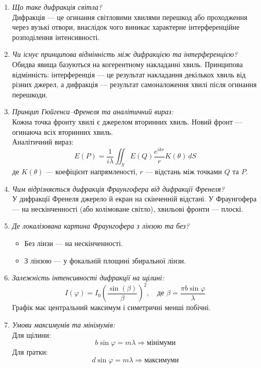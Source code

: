 \documentclass[12pt,a4paper]{article}
\begin{document}
\begin{enumerate}
  \item \textit{Що таке дифракція світла?} \\
  Дифракція --- це огинання світловими хвилями перешкод або проходження через вузькі отвори, внаслідок чого виникає характерне інтерференційне розподілення інтенсивності.

  \item \textit{Чи існує принципова відмінність між дифракцією та інтерференцією?} \\
  Обидва явища базуються на когерентному накладанні хвиль. Принципова відмінність: інтерференція — це результат накладання декількох хвиль від різних джерел, а дифракція — результат самоналоження хвилі після огинання перешкоди.

  \item \textit{Принцип Гюйгенса–Френеля та аналітичний вираз:} \\
  Кожна точка фронту хвилі є джерелом вторинних хвиль. Новий фронт — огинаюча всіх вторинних хвиль. \\ 
  Аналітичний вираз: 
  \[
    E(P) = \frac{1}{i\lambda} \iint_S E(Q) \frac{e^{ikr}}{r} K(\theta)\, dS
  \]
  де $K(\theta)$ — коефіцієнт напрямленості, $r$ — відстань між точками $Q$ та $P$.

  \item \textit{Чим відрізняється дифракція Фраунгофера від дифракції Френеля?} \\
  У дифракції Френеля джерело й екран на скінченній відстані. У Фраунгофера — на нескінченності (або колімоване світло), хвильові фронти — плоскі.

  \item \textit{Де локалізована картина Фраунгофера з лінзою та без?} \\
  \begin{itemize}
    \item Без лінзи — на нескінченності.
    \item З лінзою — у фокальній площині збиральної лінзи.
  \end{itemize}

  \item \textit{Залежність інтенсивності дифракції на щілині:} \\
  \[
    I(\varphi) = I_0 \left( \frac{\sin(\beta)}{\beta} \right)^2,
    \quad \text{де } \beta = \frac{\pi b \sin \varphi}{\lambda}
  \]
  Графік має центральний максимум і симетричні менші побічні.

  \item \textit{Умови максимумів та мінімумів:} \\
  Для щілини:
  \[
    b \sin\varphi = m\lambda \Rightarrow \text{мінімуми}
  \]
  Для ґратки:
  \[
    d \sin\varphi = m\lambda \Rightarrow \text{максимуми}
  \]


\end{enumerate}
\end{document}
